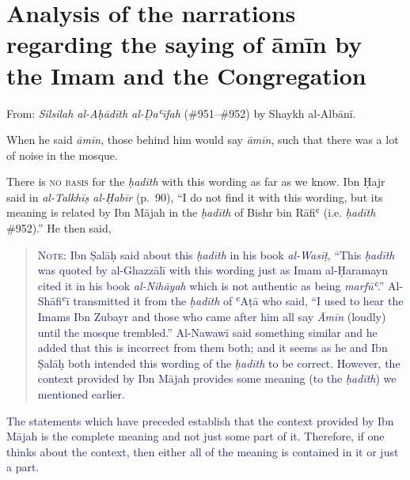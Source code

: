 \hypertarget{analysis-of-the-narrations-regarding-the-saying-of-ux101mux12bn-by-the-imam-and-the-congregation}{%
\chapter{Analysis of the narrations regarding the saying of āmīn by the
Imam and the
Congregation}\label{analysis-of-the-narrations-regarding-the-saying-of-ux101mux12bn-by-the-imam-and-the-congregation}}


From: \emph{Silsilah al-Aḥādīth al-Ḍaʿīfah} (\#951--\#952) by Shaykh
al-Albānī.

\begin{mdframed}[style=narration, frametitle={Narration \#951}]
When he said \textit{āmīn}, those behind him would say \textit{āmīn}, such that there was a lot of noise in the mosque.
\end{mdframed}

There is \textsc{no basis} for the \emph{ḥadīth} with this wording as
far as we know. Ibn Ḥajr said in \emph{al-Talkhīṣ al-Ḥabīr} (p.~90), ``I
do not find it with this wording, but its meaning is related by Ibn
Mājah in the \emph{ḥadīth} of Bishr bin Rāfiʿ (i.e. \textit{ḥadīth} \#952).''
He then said,

\begin{quote}
\textcolor{MidnightBlue}{\textsc{Note}: Ibn Ṣalāḥ said about this \emph{ḥadīth} in his book
\emph{al-Wasīṭ}, ``This \emph{ḥadīth} was quoted by al-Ghazzālī with
this wording just as Imam al-Ḥaramayn cited it in his book
\emph{al-Nihāyah} which is not authentic as being \emph{marfūʿ}.''
Al-Shāfiʿī transmitted it from the \emph{ḥadīth} of ʿAṭā who said, ``I
used to hear the Imams Ibn Zubayr and those who came after him all say
\emph{Āmīn} (loudly) until the mosque trembled.'' Al-Nawawī said
something similar and he added that this is incorrect from them both;
and it seems as he and Ibn Ṣalāḥ both intended this wording of the
\emph{ḥadīth} to be correct. However, the context provided by Ibn Mājah
provides some meaning (to the \emph{ḥadīth}) we mentioned earlier.}
\end{quote}

\textcolor{MidnightBlue}{The statements which have preceded establish that the context provided
by Ibn Mājah is the complete meaning and not just some part of it.
Therefore, if one thinks about the context, then either all of the
meaning is contained in it or just a part.}

